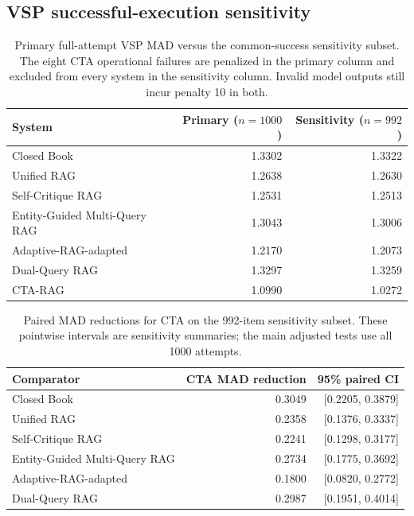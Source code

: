 \subsection{VSP successful-execution sensitivity}\label{app:vsp-sensitivity}

\begin{table}[t]
\centering
\small
\caption{Primary full-attempt VSP MAD versus the common-success sensitivity subset. The eight CTA operational failures are penalized in the primary column and excluded from every system in the sensitivity column. Invalid model outputs still incur penalty 10 in both.}
\label{tab:vsp-sensitivity}
\setlength{\tabcolsep}{5pt}
\begin{tabular}{@{}lrr@{}}
\toprule
System & Primary ($n=1000$) & Sensitivity ($n=992$) \\
\midrule
Closed Book & 1.3302 & 1.3322 \\
Unified RAG & 1.2638 & 1.2630 \\
Self-Critique RAG & 1.2531 & 1.2513 \\
Entity-Guided Multi-Query RAG & 1.3043 & 1.3006 \\
Adaptive-RAG-adapted & 1.2170 & 1.2073 \\
Dual-Query RAG & 1.3297 & 1.3259 \\
CTA-RAG & 1.0990 & 1.0272 \\
\bottomrule
\end{tabular}

\end{table}

\begin{table}[t]
\centering
\small
\caption{Paired MAD reductions for CTA on the 992-item sensitivity subset. These pointwise intervals are sensitivity summaries; the main adjusted tests use all 1000 attempts.}
\label{tab:vsp-sensitivity-ci}
\setlength{\tabcolsep}{5pt}
\begin{tabular}{@{}lrr@{}}
\toprule
Comparator & CTA MAD reduction & 95\% paired CI \\
\midrule
Closed Book & 0.3049 & [0.2205, 0.3879] \\
Unified RAG & 0.2358 & [0.1376, 0.3337] \\
Self-Critique RAG & 0.2241 & [0.1298, 0.3177] \\
Entity-Guided Multi-Query RAG & 0.2734 & [0.1775, 0.3692] \\
Adaptive-RAG-adapted & 0.1800 & [0.0820, 0.2772] \\
Dual-Query RAG & 0.2987 & [0.1951, 0.4014] \\
\bottomrule
\end{tabular}

\end{table}


